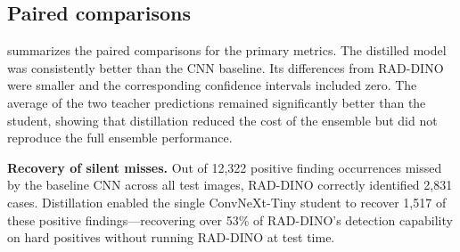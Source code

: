 \documentclass[conference]{IEEEtran}
\begin{document}
\subsection{Paired comparisons}
\label{sec:paired-comparisons}

 summarizes the paired comparisons for the primary
metrics. The distilled model was consistently better than the CNN baseline.
Its differences from RAD-DINO were smaller and the corresponding confidence
intervals included zero. The average of the two teacher predictions remained
significantly better than the student, showing that distillation reduced the
cost of the ensemble but did not reproduce the full ensemble performance.

\begin{table}[htbp]
\caption{Paired patient-level bootstrap comparisons. Differences are reported as model A minus model B. $p$-values are Holm corrected.}
\label{tab:paired-results}
\centering
\small
{}
\end{table}

\textbf{Recovery of silent misses.} Out of 12,322 positive finding occurrences missed by the baseline CNN across all test images, RAD-DINO correctly identified 2,831 cases. Distillation enabled the single ConvNeXt-Tiny student to recover 1,517 of these positive findings—recovering over 53\% of RAD-DINO's detection capability on hard positives without running RAD-DINO at test time.
\end{document}
